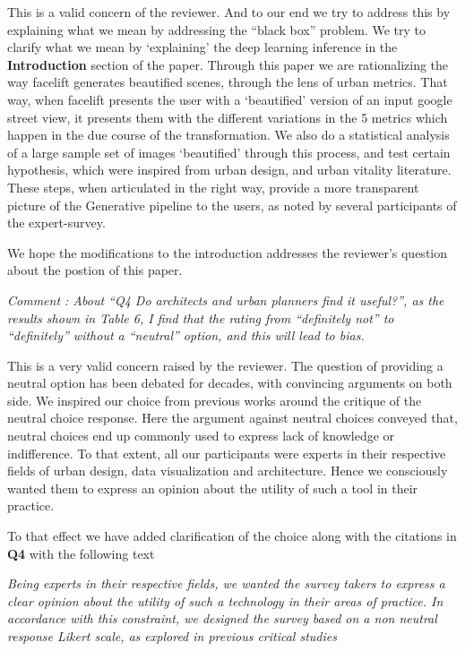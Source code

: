 \documentclass{paper}
\newenvironment{myquote}
{\definecolor{shadecolor}{rgb}{0.9,0.95,1} \begin{shaded*} \sf \em}
{\em\end{shaded*}}
\newenvironment{myquoteOrange}
{\definecolor{shadecolor}{rgb}{1,0.9,0.83} \begin{shaded*} \sf \em}
{\em\end{shaded*}}
\begin{document}
\noindent %
This is a valid concern of the reviewer. And to our end we try to address this by explaining what we mean by addressing the ``black box'' problem. We try to clarify what we mean by `explaining' the deep learning inference in the \textbf{Introduction} section of the paper. Through this paper we are rationalizing the way facelift generates beautified scenes, through the lens of urban metrics. That way, when facelift presents the user with a `beautified' version of an input google street view, it presents them with the different variations in the 5 metrics which happen in the due course of the transformation. We also do a statistical analysis of a large sample set of images `beautified' through this process, and test certain hypothesis, which were inspired from urban design, and urban vitality literature. These steps, when articulated in the right way, provide a more transparent picture of the Generative pipeline to the users, as noted by several participants of the expert-survey. 

We hope the modifications to the introduction addresses the reviewer's question about the postion of this paper.

\begin{myquote}
\noindent Comment : About “Q4 Do architects and urban planners find it useful?”, as the results shown in Table 6, I find that the rating from “definitely not” to “definitely” without a “neutral” option, and this will lead to bias.
\end{myquote}
\noindent %

This is a very valid concern raised by the reviewer. The question of providing a neutral option has been debated for decades, with convincing arguments on both side. We inspired our choice from previous works\cite{moors2008exploring}\cite{Agree2012} around the critique of the neutral choice response. Here the argument against neutral choices conveyed that, neutral choices end up commonly used to express lack of knowledge or indifference. To that extent, all our participants were experts in their respective fields of urban design, data visualization and architecture. Hence we consciously wanted them to express an opinion about the utility of such a tool in their practice. 

To that effect we have added clarification of the choice along with the citations in \textbf{Q4} with the following text 

\begin{myquoteOrange}

\textit{Being experts in their respective fields, we wanted the survey takers to express a clear opinion about the utility of such a technology in their areas of practice. In accordance with this constraint, we designed the survey based on a non neutral response Likert scale, as explored in previous critical studies \cite{Agree2012,moors2008exploring}}

\end{myquoteOrange}
\end{document}

